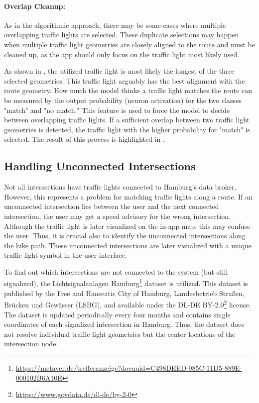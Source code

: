 \paragraph{Overlap Cleanup:} As in the algorithmic approach, there may be some cases where multiple overlapping traffic lights are selected. These duplicate selections may happen when multiple traffic light geometries are closely aligned to the route and must be cleaned up, as the app should only focus on the traffic light most likely used. 

As shown in , the utilized traffic light is most likely the longest of the three selected geometries. This traffic light arguably has the best alignment with the route geometry. How much the model thinks a traffic light matches the route can be measured by the output probability (neuron activation) for the two classes "match" and "no match." This feature is used to force the model to decide between overlapping traffic lights. If a sufficient overlap between two traffic light geometries is detected, the traffic light with the higher probability for "match" is selected. The result of this process is highlighted in .

\subsection{Handling Unconnected Intersections}

Not all intersections have traffic lights connected to Hamburg's data broker. However, this represents a problem for matching traffic lights along a route. If an unconnected intersection lies between the user and the next connected intersection, the user may get a speed advisory for the wrong intersection. Although the traffic light is later visualized on the in-app map, this may confuse the user. Thus, it is crucial also to identify the unconnected intersections along the bike path. These unconnected intersections are later visualized with a unique traffic light symbol in the user interface.

To find out which intersections are not connected to the system (but still signalized), the Lichtsignalanlagen Hamburg\footnote{\url{https://metaver.de/trefferanzeige?docuuid=C498DEED-985C-11D5-889E-000102B6A10E}} dataset is utilized. This dataset is published by the Free and Hanseatic City of Hamburg, Landesbetrieb Straßen, Brücken und Gewässer (LSBG), and available under the DL-DE BY-2.0\footnote{\url{https://www.govdata.de/dl-de/by-2-0}} license. The dataset is updated periodically every four months and contains single coordinates of each signalized intersection in Hamburg. Thus, the dataset does not resolve individual traffic light geometries but the center locations of the intersection node. 

